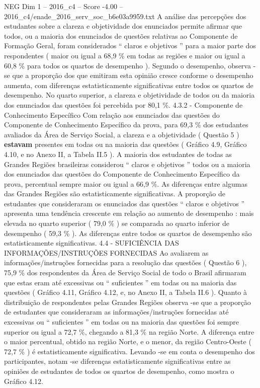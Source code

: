 \begin{textsample}{NEG Dim 1 – 2016\_c4 – Score -4.00 – 2016\_c4/enade\_2016\_serv\_soc\_b6e03a9959.txt}
A análise das percepções dos estudantes sobre a clareza e objetividade dos enunciados permite afirmar que todos, ou a maioria dos enunciados de questões relativas ao Componente de Formação Geral, foram considerados “ claros e objetivos ” para a maior parte dos respondentes ( maior ou igual a 68,9 \% em todas as regiões e maior ou igual a 60,8 \% para todos os quartos de desempenho ).
Segundo o desempenho, observa -se que a proporção dos que emitiram esta opinião cresce conforme o desempenho aumenta, com diferenças estatisticamente significativas entre todos os quartos de desempenho.
No quarto superior, a clareza e objetividade de todos ou da maioria dos enunciados das questões foi percebida por 80,1 \%. 4.3.2 - Componente de Conhecimento Específico Com relação aos enunciados das questões do Componente de Conhecimento Específico da prova, para 69,3 \% dos estudantes avaliados da Área de Serviço Social, a clareza e a objetividade ( Questão 5 ) \textbf{estavam} presentes em todas ou na maioria das questões ( Gráfico 4.9, Gráfico 4.10, e no Anexo II, a Tabela II.5 ).
A maioria dos estudantes de todas as Grandes Regiões brasileiras considerou “ claros e objetivos ” todos ou a maioria dos enunciados das questões do Componente de Conhecimento Específico da prova, percentual sempre maior ou igual a 66,9 \%.
As diferenças entre algumas das Grandes Regiões são estatisticamente significativas.
A proporção de estudantes que consideraram os enunciados das questões “ claros e objetivos ” apresenta uma tendência crescente em relação ao aumento de desempenho : mais elevada no quarto superior ( 79,0 \% ) se comparada ao quarto inferior de desempenho ( 59,3 \% ).
As diferenças entre todos os quartos de desempenho são estatisticamente significativas. 4.4 - SUFICIÊNCIA DAS INFORMAÇÕES/INSTRUÇÕES FORNECIDAS Ao avaliarem as informações/instruções fornecidas para a resolução das questões ( Questão 6 ), 75,9 \% dos respondentes da Área de Serviço Social de todo o Brasil afirmaram que estas eram até excessivas ou “ suficientes ” em todas ou na maioria das questões ( Gráfico 4.11, Gráfico 4.12, e, no Anexo II, a Tabela II.6 ).
Quanto à distribuição de respondentes pelas Grandes Regiões observa -se que a proporção de estudantes que consideraram as informações/instruções fornecidas até excessivas ou “ suficientes ” em todas ou na maioria das questões foi sempre superior ou igual a 72,7 \%, chegando a 81,3 \% na região Norte.
A diferença entre o maior percentual, obtido na região Norte, e o menor, da região Centro-Oeste ( 72,7 \% ) é estatisticamente significativa.
Levando -se em conta o desempenho dos participantes, notam -se diferenças estatisticamente significativas entre as opiniões de estudantes de todos os quartos de desempenho, como mostra o Gráfico 4.12.

\end{textsample}
